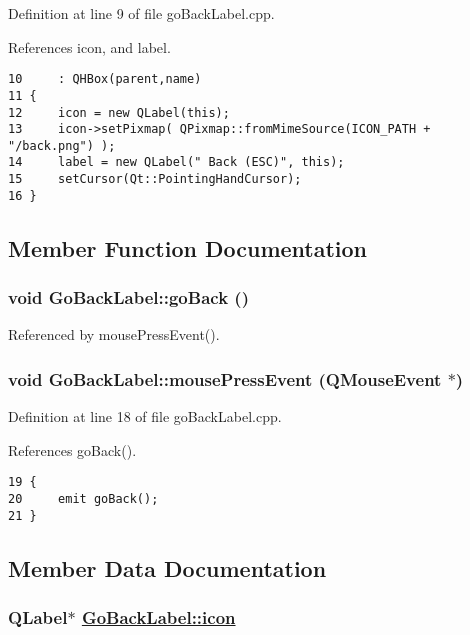 Definition at line 9 of file go\-Back\-Label.cpp.

References icon, and label.

\footnotesize\begin{verbatim}10     : QHBox(parent,name)
11 {
12     icon = new QLabel(this);
13     icon->setPixmap( QPixmap::fromMimeSource(ICON_PATH + "/back.png") );
14     label = new QLabel(" Back (ESC)", this);
15     setCursor(Qt::PointingHandCursor);
16 }
\end{verbatim}\normalsize 




\subsection{Member Function Documentation}
\hypertarget{classGoBackLabel_l0}{
\subsubsection[goBack]{\setlength{\rightskip}{0pt plus 5cm}void Go\-Back\-Label::go\-Back ()}}
\label{classGoBackLabel_l0}




Referenced by mouse\-Press\-Event().\hypertarget{classGoBackLabel_b0}{
\subsubsection[mousePressEvent]{\setlength{\rightskip}{0pt plus 5cm}void Go\-Back\-Label::mouse\-Press\-Event (QMouse\-Event $\ast$)}}
\label{classGoBackLabel_b0}


Definition at line 18 of file go\-Back\-Label.cpp.

References go\-Back().

\footnotesize\begin{verbatim}19 {
20     emit goBack();
21 }
\end{verbatim}\normalsize 




\subsection{Member Data Documentation}
\hypertarget{classGoBackLabel_r1}{
\subsubsection[icon]{\setlength{\rightskip}{0pt plus 5cm}QLabel$\ast$ \hyperlink{classGoBackLabel_r1}{Go\-Back\-Label::icon}}}
\label{classGoBackLabel_r1}


